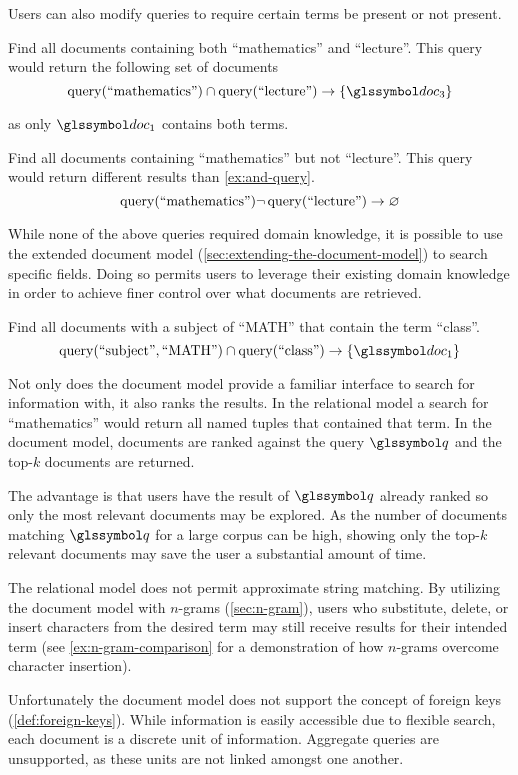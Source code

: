 		Users can also modify queries to require certain terms be present or not present.
		
		\begin{ex}
		\label{ex:and-query}
			Find all documents containing both ``mathematics'' and ``lecture''.  This query would return the following set of documents
			\[
				\query(\text{``mathematics''}) \cap \query(\text{``lecture''}) \rightarrow \{\doc_3\}
			\]
			
			as only \(\doc_1\) contains both terms.
		\end{ex}
		
		\begin{ex}
			Find all documents containing ``mathematics'' but not ``lecture''.  This query would return different results than \vref{ex:and-query}.
			\[
				\operatorname{query}(\text{``mathematics''})\neg\operatorname{query}(\text{``lecture''}) \rightarrow \varnothing
			\]
		\end{ex}
		
		While none of the above queries required domain knowledge, it is possible to use the extended document model (\vref{sec:extending-the-document-model}) to search specific fields.  Doing so permits users to leverage their existing domain knowledge in order to achieve finer control over what documents are retrieved.
		
		\begin{ex}
		\label{ex:extended-query}
			Find all documents with a subject of ``MATH'' that contain the term ``class''.
			\[
				\query(\text{``subject''}, \text{``MATH''}) \cap \query(\text{``class''}) \rightarrow \{\doc_1\}
			\]
		\end{ex}
		
		Not only does the document model provide a familiar interface to search for information with, it also ranks the results.  In the relational model a search for ``mathematics'' would return all named tuples that contained that term.  In the document model, documents are ranked against the query \(\q\) and the top-\(k\) documents are returned.
		
		The advantage is that users have the result of \(\q\) already ranked so only the most relevant documents may be explored.	 As the number of documents matching \(\q\) for a large corpus can be high, showing only the top-\(k\) relevant documents may save the user a substantial amount of time.
		
		The relational model does not permit approximate string matching.  By utilizing the document model with \(n\)-grams (\vref{sec:n-gram}), users who substitute, delete, or insert characters from the desired term may still receive results for their intended term (see \vref{ex:n-gram-comparison} for a demonstration of how \(n\)-grams overcome character insertion).
		
		Unfortunately the document model does not support the concept of foreign keys (\vref{def:foreign-keys}).  While information is easily accessible due to flexible search, each document is a discrete unit of information.  Aggregate queries are unsupported, as these units are not linked amongst one another.